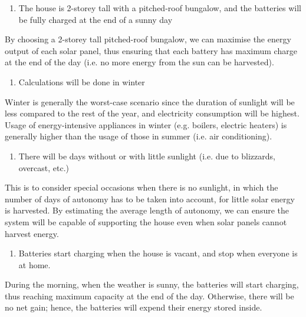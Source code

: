 \begin{enumerate}
    \item The house is 2-storey tall with a pitched-roof bungalow, and the batteries will be fully charged at the end of a sunny day
\end{enumerate}
By choosing a 2-storey tall pitched-roof bungalow, we can maximise the energy output of each solar panel, thus ensuring that each battery has maximum charge at the end of the day (i.e. no more energy from the sun can be harvested). 
\begin{enumerate}[resume]
    \item Calculations will be done in winter
\end{enumerate}
Winter is generally the worst-case scenario since the duration of sunlight will be less compared to the rest of the year, and electricity consumption will be highest. Usage of energy-intensive appliances in winter (e.g. boilers, electric heaters) is generally higher than the usage of those in summer (i.e. air conditioning).
\begin{enumerate}[resume]
    \item There will be days without or with little sunlight (i.e. due to blizzards, overcast, etc.)
\end{enumerate}
This is to consider special occasions when there is no sunlight, in which the number of days of autonomy has to be taken into account, for little solar energy is harvested. By estimating the average length of autonomy, we can ensure the system will be capable of supporting the house even when solar panels cannot harvest energy.
\begin{enumerate}[resume]
    \item Batteries start charging when the house is vacant, and stop when everyone is at home.
\end{enumerate}
During the morning, when the weather is sunny, the batteries will start charging, thus reaching maximum capacity at the end of the day. Otherwise, there will be no net gain; hence, the batteries will expend their energy stored inside.